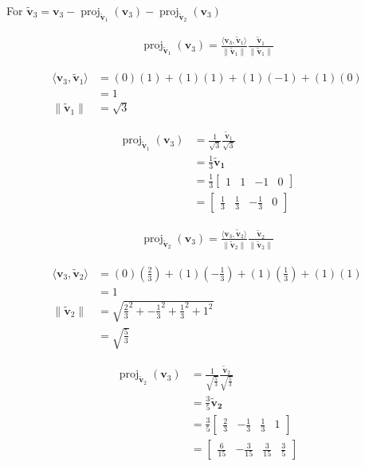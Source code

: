 \documentclass{tufte-book}
\DeclareMathOperator{\proj}{proj}
\newcommand{\vct}{\mathbf}
\newcommand{\dprod}[2]{\langle #1, #2 \rangle}
\theoremstyle{mytheoremstyle}
\theoremstyle{mylemstyle}
\theoremstyle{mydefstyle}
\begin{document}
\begin{enumerate}
For $\vct{\tilde{v}}_3 = \vct{v}_3 - \proj_{\vct{\tilde{v}}_1}(\vct{v}_3)- \proj_{\vct{\tilde{v}}_2}(\vct{v}_3)$

\begin{align*}
\proj_{\vct{\tilde{v}}_1}(\vct{v}_3) = \frac{\dprod{\vct{v}_3}{\vct{\tilde{v}}_1}}{\|\vct{\tilde{v}}_1\|}\frac{\vct{\tilde{v}}_1}{\|\vct{\tilde{v}}_1\|}
\end{align*}

\begin{align*}
\dprod{\vct{v}_3}{\vct{\tilde{v}}_1} &= (0)(1) + (1)(1) + (1)(-1) +(1)(0)\\
&=1 \\
\|\vct{\tilde{v}}_1\| &= \sqrt{3}
\end{align*}

\begin{align*}
\proj_{\vct{\tilde{v}}_1}(\vct{v}_3) &= \frac{1}{\sqrt{3}}\frac{\vct{\tilde{v}}_1}{\sqrt{3}}\\
&= \frac{1}{3}\vct{\tilde{v}_1}\\
&= \frac{1}{3}
\begin{bmatrix}
1 & 1 & -1 & 0
\end{bmatrix} \\
&=
\begin{bmatrix}
\frac{1}{3} & {\frac{1}{3}} &-\frac{1}{3} & 0
\end{bmatrix}
\end{align*}

\begin{align*}
\proj_{\vct{\tilde{v}}_2}(\vct{v}_3) = \frac{\dprod{\vct{v}_3}{\vct{\tilde{v}}_2}}{\|\vct{\tilde{v}}_2\|}\frac{\vct{\tilde{v}}_2}{\|\vct{\tilde{v}}_2\|}
\end{align*}

\begin{align*}
\dprod{\vct{v}_3}{\vct{\tilde{v}}_2} &= (0)(\frac{2}{3}) + (1)({-\frac{1}{3}}) + (1)(\frac{1}{3}) +(1)(1)\\
&=1 \\
\|\vct{\tilde{v}}_2\| &= \sqrt{\frac{2}{3}^2+{-\frac{1}{3}}^2+\frac{1}{3}^2+1^2} \\
&= \sqrt{\frac{5}{3}}
\end{align*}

\begin{align*}
\proj_{\vct{\tilde{v}}_2}(\vct{v}_3) &= \frac{1}{\sqrt{\frac{5}{3}}}\frac{\vct{\tilde{v}}_2}{\sqrt{\frac{5}{3}}}\\
&= \frac{3}{5}\vct{\tilde{v}_2}\\
&= \frac{3}{5}
\begin{bmatrix}
\frac{2}{3} & -\frac{1}{3} &\frac{1}{3} & 1
\end{bmatrix} \\
&=
\begin{bmatrix}
\frac{6}{15} & {-\frac{3}{15}} &\frac{3}{15} & \frac{3}{5}
\end{bmatrix}
\end{align*}


\end{enumerate}
\end{document}
